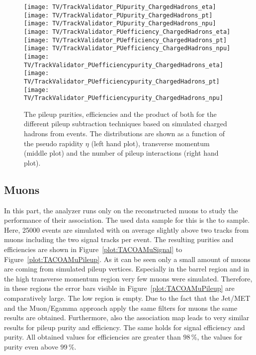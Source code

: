 \begin{figure}[h!t]
  \centering
  \texttt{[image: TV/TrackValidator\_PUpurity\_ChargedHadrons\_eta]}
  \texttt{[image: TV/TrackValidator\_PUpurity\_ChargedHadrons\_pt]}
  \texttt{[image: TV/TrackValidator\_PUpurity\_ChargedHadrons\_npu]}
  \newline
  \texttt{[image: TV/TrackValidator\_PUefficiency\_ChargedHadrons\_eta]}
  \texttt{[image: TV/TrackValidator\_PUefficiency\_ChargedHadrons\_pt]}
  \texttt{[image: TV/TrackValidator\_PUefficiency\_ChargedHadrons\_npu]}
  \newline
  \texttt{[image: TV/TrackValidator\_PUefficiencypurity\_ChargedHadrons\_eta]}
  \texttt{[image: TV/TrackValidator\_PUefficiencypurity\_ChargedHadrons\_pt]}
  \texttt{[image: TV/TrackValidator\_PUefficiencypurity\_ChargedHadrons\_npu]}
  \caption[Pileup purity, efficiency and their product for the different pileup subtraction techniques based on simulated charged hadrons from \ttbar events]{The pileup purities, efficiencies and the product of both for the different pileup subtraction techniques based on simulated charged hadrons from \ttbar events. The distributions are shown as a function of the pseudo rapidity $\eta$ (left hand plot), transverse momentum (middle plot) and the number of pileup interactions (right hand plot). \label{plot:TACOACHPileup}}
\end{figure}



\subsection{Muons \label{sec:TASEFRDAM}}

In this part, the analyzer runs only on the reconstructed muons to study the performance of their association. The used data sample for this is the \Zz to \MM sample. Here, 25000 events are simulated with on average slightly above two tracks from muons including the two signal tracks per event. The resulting purities and efficiencies are shown in Figure~\ref{plot:TACOAMuSignal} to Figure~\ref{plot:TACOAMuPileup}. As it can be seen only a small amount of muons are coming from simulated pileup vertices. Especially in the barrel region and in the high transverse momentum region very few muons were simulated. Therefore, in these regions the error bars visible in Figure~\ref{plot:TACOAMuPileup} are comparatively large. The low \pt region is empty. Due to the fact that the Jet/MET and the Muon/Egamma approach apply the same filters for muons the same results are obtained. Furthermore, also the association map leads to very similar results for pileup purity and efficiency. The same holds for signal efficiency and purity. All obtained values for efficiencies are greater than $98\,\%$, the values for purity even above $99\,\%$.

